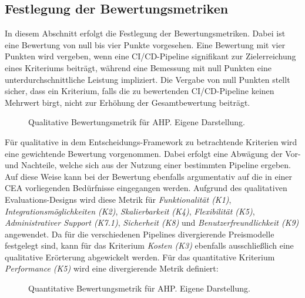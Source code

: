 \subsection{Festlegung der Bewertungsmetriken}
\label{sec:Metriken}
In diesem Abschnitt erfolgt die Festlegung der Bewertungsmetriken. Dabei ist eine Bewertung von null bis vier Punkte vorgesehen. Eine Bewertung mit vier Punkten wird vergeben, wenn eine CI/CD-Pipeline signifikant zur Zielerreichung eines Kriteriums beiträgt, während eine Bemessung mit null Punkten eine unterdurchschnittliche Leistung impliziert. Die Vergabe von null Punkten stellt sicher, dass ein Kriterium, falls die zu bewertenden CI/CD-Pipeline keinen Mehrwert birgt, nicht zur Erhöhung der Gesamtbewertung beiträgt. 
\begin{center}
	\begin{figure}[H]
		\centering
		\caption[Qualitative Bewertungsmetrik für AHP]{Qualitative Bewertungsmetrik für AHP. Eigene Darstellung.}
		\label{fig:metrik}
	\end{figure}
\end{center}
\vspace*{-15mm}
Für qualitative in dem Entscheidungs-Framework zu betrachtende Kriterien wird eine gewichtende Bewertung vorgenommen. Dabei erfolgt eine Abwägung der Vor- und Nachteile, welche sich aus der Nutzung einer bestimmten Pipeline ergeben. Auf diese Weise kann bei der Bewertung ebenfalls argumentativ auf die in einer CEA vorliegenden Bedürfnisse eingegangen werden.
Aufgrund des qualitativen Evaluations-Designs wird diese Metrik für \textit{Funktionalität (K1)}, \textit{Integrationsmöglichkeiten (K2)}, \textit{Skalierbarkeit (K4)}, \textit{Flexibilität (K5)}, \textit{Administrativer Support (K7.1)}, \textit{Sicherheit (K8)} und \textit{Benutzerfreundlichkeit (K9)} angewendet. Da für die verschiedenen Pipelines divergierende Preismodelle festgelegt sind, kann für das Kriterium \textit{Kosten (K3)} ebenfalls ausschließlich eine qualitative Erörterung abgewickelt werden. Für das quantitative Kriterium \textit{Performance (K5)} wird eine divergierende Metrik definiert: 
\begin{center}
	\begin{figure}[H]
		\centering
		\caption[Quantitative Bewertungsmetrik für AHP]{Quantitative Bewertungsmetrik für AHP. Eigene Darstellung.}
		\label{fig:metrik_qual}
	\end{figure}
\end{center}
